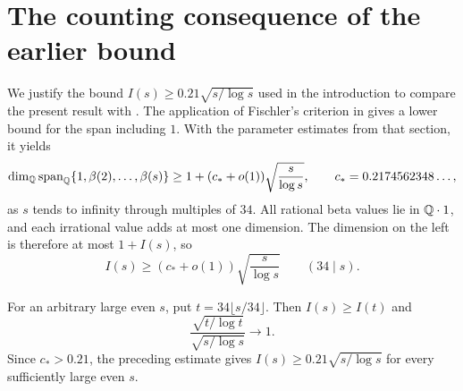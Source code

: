 \section{The counting consequence of the earlier bound}
\label{app:earlier-count}

We justify the bound $I(s)\ge0.21\sqrt{s/\log s}$ used in the
introduction to compare the present result with \cite{Tind}.
The application of Fischler's criterion in \cite[Section~7]{Tind}
gives a lower bound for the span including $1$. With the parameter
estimates from that section, it yields
\[
 \dim_\mathbb Q\operatorname{span}_\mathbb Q\{1,\beta(2),\ldots,\beta(s)\}
 \ge 1+(c_*+o(1))\sqrt{\frac{s}{\log s}},
 \qquad c_*=0.2174562348\ldots,
\]
as $s$ tends to infinity through multiples of $34$.
All rational beta values lie in $\mathbb Q\cdot1$, and each irrational
value adds at most one dimension. The dimension on the left is
therefore at most $1+I(s)$, so
\[
 I(s)\ge(c_*+o(1))\sqrt{\frac{s}{\log s}}
 \qquad(34\mid s).
\]

For an arbitrary large even $s$, put $t=34\lfloor s/34\rfloor$.
Then $I(s)\ge I(t)$ and
\[
 \frac{\sqrt{t/\log t}}{\sqrt{s/\log s}}\longrightarrow1.
\]
Since $c_*>0.21$, the preceding estimate gives
$I(s)\ge0.21\sqrt{s/\log s}$ for every sufficiently large even $s$.
